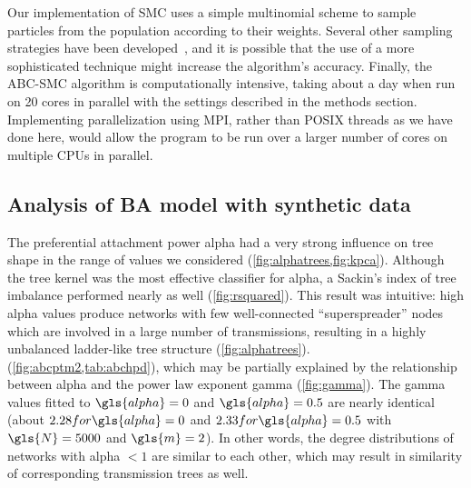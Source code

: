 Our implementation of \gls{SMC} uses a simple multinomial scheme to sample
particles from the population according to their weights. Several other
sampling strategies have been developed~\autocite{douc2005comparison}, and it
is possible that the use of a more sophisticated technique might increase the
algorithm's accuracy. Finally, the \gls{ABC}-\gls{SMC} algorithm is
computationally intensive, taking about a day when run on 20 cores in parallel
with the settings described in the methods section. Implementing
parallelization using \gls{MPI}, rather than \gls{POSIX} threads as we have
done here, would allow the program to be run over a larger number of cores on
multiple CPUs in parallel.

\subsection{Analysis of \acrlong{BA} model with synthetic data}

The preferential attachment power \gls{alpha} had a very strong influence on
tree shape in the range of values we considered
(\cref{fig:alphatrees,fig:kpca}). Although the tree kernel was the most
effective classifier for \gls{alpha}, a Sackin's index of tree imbalance
performed nearly as well (\cref{fig:rsquared}). This result was intuitive: high
\gls{alpha} values produce networks with few well-connected ``superspreader''
nodes which are involved in a large number of transmissions, resulting in a
highly unbalanced ladder-like tree structure (\cref{fig:alphatrees}). 
 
(\cref{fig:abcptm2,tab:abchpd}), which may be partially explained by the
relationship between \gls{alpha} and the power law exponent \gls{gamma}
(\cref{fig:gamma}).  The \gls{gamma} values fitted to $\gls{alpha} = 0$
and $\gls{alpha} = 0.5$ are nearly identical (about $2.28 for \gls{alpha} = 0$
and $2.33 for \gls{alpha} = 0.5$ with $\gls{N} = 5000$ and $\gls{m} = 2$). In
other words, the degree distributions of networks with \gls{alpha} $< 1$ are
similar to each other, which may result in similarity of corresponding
transmission trees as well. 


